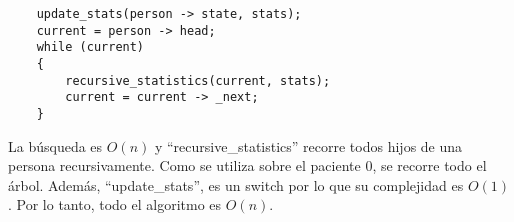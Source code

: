 \documentclass[letter]{article}
\begin{document}
\begin{parte}{1}
	\begin{lstlisting}
	update_stats(person -> state, stats);
	current = person -> head;
	while (current)
	{
		recursive_statistics(current, stats);
		current = current -> _next;
	}
	\end{lstlisting}
	\vspace{0.2cm}
	
	La búsqueda es $O(n)$ y ``recursive\_statistics'' recorre todos hijos de una persona recursivamente. Como se utiliza sobre el paciente 0, se recorre todo el árbol. Además, ``update\_stats'', es un switch por lo que su complejidad es $O(1)$. Por lo tanto, todo el algoritmo es $O(n)$.\\\\
	
	
	\end{parte}
	
\end{document}
